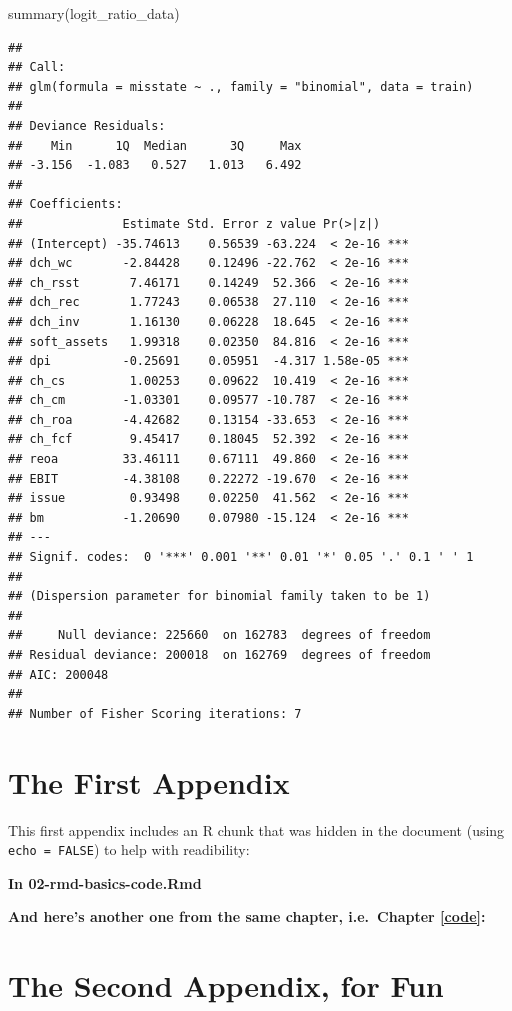 \documentclass[a4paper, nobind]{templates/ociamthesis}
\newenvironment{Shaded}{\begin{snugshade}}{\end{snugshade}}
\newcommand{\FunctionTok}[1]{\textcolor[rgb]{0.00,0.00,0.00}{#1}}
\newcommand{\NormalTok}[1]{#1}
\renewenvironment{Shaded}
{
  \vspace{10pt}%
  \begin{snugshade}%
}{%
  \end{snugshade}%
  \vspace{8pt}%
}
\newcommand*{\bibtitle}{Works Cited}
\begin{document}
\begin{Shaded}
\begin{Highlighting}[]
\FunctionTok{summary}\NormalTok{(logit\_ratio\_data)}
\end{Highlighting}
\end{Shaded}

\begin{verbatim}
## 
## Call:
## glm(formula = misstate ~ ., family = "binomial", data = train)
## 
## Deviance Residuals: 
##    Min      1Q  Median      3Q     Max  
## -3.156  -1.083   0.527   1.013   6.492  
## 
## Coefficients:
##              Estimate Std. Error z value Pr(>|z|)    
## (Intercept) -35.74613    0.56539 -63.224  < 2e-16 ***
## dch_wc       -2.84428    0.12496 -22.762  < 2e-16 ***
## ch_rsst       7.46171    0.14249  52.366  < 2e-16 ***
## dch_rec       1.77243    0.06538  27.110  < 2e-16 ***
## dch_inv       1.16130    0.06228  18.645  < 2e-16 ***
## soft_assets   1.99318    0.02350  84.816  < 2e-16 ***
## dpi          -0.25691    0.05951  -4.317 1.58e-05 ***
## ch_cs         1.00253    0.09622  10.419  < 2e-16 ***
## ch_cm        -1.03301    0.09577 -10.787  < 2e-16 ***
## ch_roa       -4.42682    0.13154 -33.653  < 2e-16 ***
## ch_fcf        9.45417    0.18045  52.392  < 2e-16 ***
## reoa         33.46111    0.67111  49.860  < 2e-16 ***
## EBIT         -4.38108    0.22272 -19.670  < 2e-16 ***
## issue         0.93498    0.02250  41.562  < 2e-16 ***
## bm           -1.20690    0.07980 -15.124  < 2e-16 ***
## ---
## Signif. codes:  0 '***' 0.001 '**' 0.01 '*' 0.05 '.' 0.1 ' ' 1
## 
## (Dispersion parameter for binomial family taken to be 1)
## 
##     Null deviance: 225660  on 162783  degrees of freedom
## Residual deviance: 200018  on 162769  degrees of freedom
## AIC: 200048
## 
## Number of Fisher Scoring iterations: 7
\end{verbatim}

\startappendices

\hypertarget{the-first-appendix}{%
\chapter{The First Appendix}\label{the-first-appendix}}

This first appendix includes an R chunk that was hidden in the document (using \texttt{echo\ =\ FALSE}) to help with readibility:

\textbf{In 02-rmd-basics-code.Rmd}

\textbf{And here's another one from the same chapter, i.e.~Chapter \ref{code}:}

\hypertarget{the-second-appendix-for-fun}{%
\chapter{The Second Appendix, for Fun}\label{the-second-appendix-for-fun}}


\setlength{\baselineskip}{0pt} %

{\renewcommand*\MakeUppercase[1]{#1}%
\printbibliography[heading=bibintoc,title={\bibtitle}]}
\end{document}
